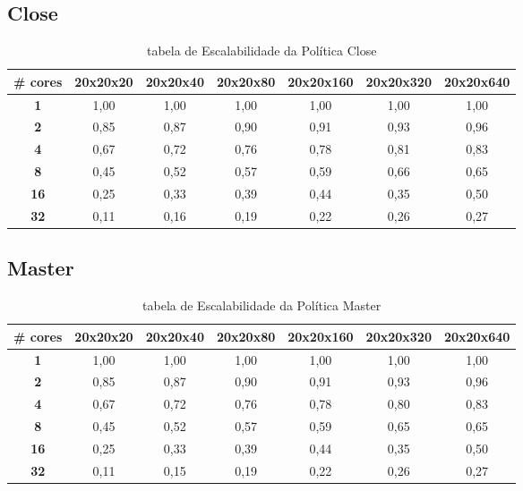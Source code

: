 \documentclass[a4paper, 12pt]{article}
\begin{document}
	\subsection{Close}
	\begin{table}[htbp]
		\centering
		\begin{tabular}{|c|c|c|c|c|c|c|}
			\hline
			\textbf{\# cores} & \textbf{20x20x20} & \textbf{20x20x40} & \textbf{20x20x80} & \textbf{20x20x160} & \textbf{20x20x320} & \textbf{20x20x640} \\
			\hline
			\textbf{1} & 1,00 & 1,00 & 1,00 & 1,00 & 1,00 & 1,00 \\
			\hline
			\textbf{2} & 0,85 & 0,87 & 0,90 & 0,91 & 0,93 & 0,96 \\
			\hline
			\textbf{4} & 0,67 & 0,72 & 0,76 & 0,78 & 0,81 & 0,83 \\
			\hline
			\textbf{8} & 0,45 & 0,52 & 0,57 & 0,59 & 0,66 & 0,65 \\
			\hline
			\textbf{16} & 0,25 & 0,33 & 0,39 & 0,44 & 0,35 & 0,50 \\
			\hline
			\textbf{32} & 0,11 & 0,16 & 0,19 & 0,22 & 0,26 & 0,27 \\
			\hline
		\end{tabular}
		\caption{tabela de Escalabilidade da Política Close}
	\end{table}
	
	\vspace{5cm}
	
	\subsection{Master}
	\begin{table}[htbp]
		\centering
		\begin{tabular}{|c|c|c|c|c|c|c|}
			\hline
			\textbf{\# cores} & \textbf{20x20x20} & \textbf{20x20x40} & \textbf{20x20x80} & \textbf{20x20x160} & \textbf{20x20x320} & \textbf{20x20x640} \\
			\hline
			\textbf{1} & 1,00 & 1,00 & 1,00 & 1,00 & 1,00 & 1,00 \\
			\hline
			\textbf{2} & 0,85 & 0,87 & 0,90 & 0,91 & 0,93 & 0,96 \\
			\hline
			\textbf{4} & 0,67 & 0,72 & 0,76 & 0,78 & 0,80 & 0,83 \\
			\hline
			\textbf{8} & 0,45 & 0,52 & 0,57 & 0,59 & 0,65 & 0,65 \\
			\hline
			\textbf{16} & 0,25 & 0,33 & 0,39 & 0,44 & 0,35 & 0,50 \\
			\hline
			\textbf{32} & 0,11 & 0,15 & 0,19 & 0,22 & 0,26 & 0,27 \\
			\hline
		\end{tabular}
		\caption{tabela de Escalabilidade da Política Master}
	\end{table}

	
	
	

	 
\end{document}
